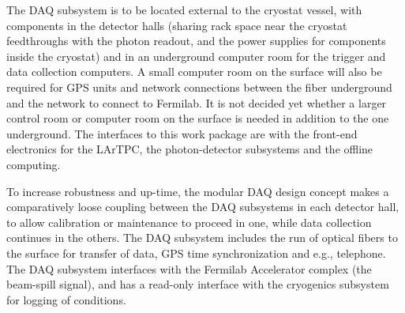 The DAQ subsystem is to be located external to the cryostat vessel,
with components in the detector halls (sharing rack space near the
cryostat feedthroughs with the photon readout, and the power supplies
for components inside the cryostat) and in an underground computer
room for the trigger and data collection computers.  A small computer
room on the surface will also be required for GPS units and network 
connections between the fiber underground and the network to connect 
to Fermilab.  It is not decided yet whether a larger control room or 
computer room on the surface is needed in addition to the one underground. 
The interfaces to this work package are with the front-end electronics for the LArTPC, the
photon-detector subsystems and the offline computing.  

To increase
robustness and up-time, the modular DAQ design concept makes a
comparatively loose coupling between the DAQ subsystems in each
detector hall, to allow calibration or maintenance to proceed in one,
while data collection continues in the others.  The DAQ subsystem
includes the run of optical fibers to the surface for transfer of data,
GPS time synchronization and e.g., telephone.  The DAQ subsystem
interfaces with the Fermilab Accelerator complex (the beam-spill
signal), and has a read-only interface with the cryogenics subsystem
for logging of conditions.  

